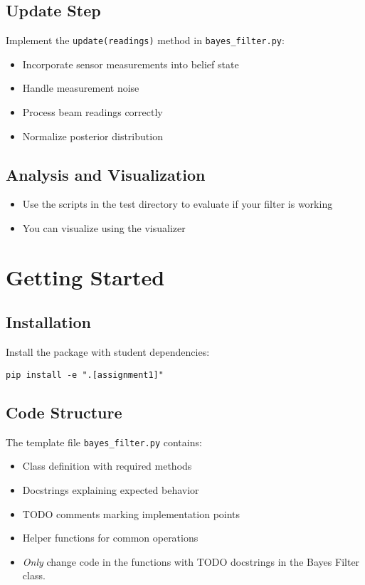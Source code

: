 \documentclass[11pt]{article}
\begin{document}
\subsection{Update Step }
Implement the \texttt{update(readings)} method in \texttt{bayes\_filter.py}:
\begin{itemize}
    \item Incorporate sensor measurements into belief state
    \item Handle measurement noise
    \item Process beam readings correctly
    \item Normalize posterior distribution
\end{itemize}

\subsection{Analysis and Visualization }
\begin{itemize}
    \item Use the scripts in the test directory to evaluate if your filter is working
    \item You can visualize using the visualizer

\end{itemize}

\section{Getting Started}

\subsection{Installation}
Install the package with student dependencies:
\begin{verbatim}
pip install -e ".[assignment1]"
\end{verbatim}

\subsection{Code Structure}
The template file \texttt{bayes\_filter.py} contains:
\begin{itemize}
    \item Class definition with required methods
    \item Docstrings explaining expected behavior
    \item TODO comments marking implementation points
    \item Helper functions for common operations
    \item \emph{Only} change code in the functions with TODO docstrings in the Bayes Filter class.
\end{itemize}
\end{document}
